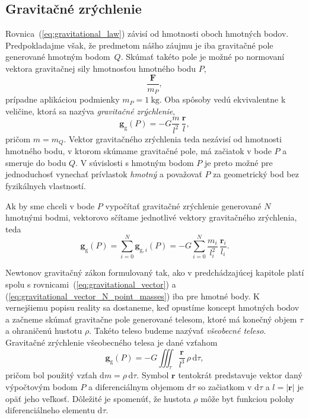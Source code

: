 \documentclass[a4paper, 12pt]{book}
\newcommand{\diff}{\mathrm d}
\newcommand{\gidx}{\mathrm g}
\let\vec\mathbf
\begin{document}
\subsection{Gravitačné zrýchlenie}

Rovnica~(\ref{eq:gravitational_law}) závisí od hmotnosti oboch hmotných bodov.  
Predpokladajme však, že predmetom nášho záujmu je iba gravitačné pole 
generované hmotným bodom~$Q$.  Skúmať takéto pole je možné po normovaní vektora 
gravitačnej sily hmotnosťou hmotného bodu $P$,
%
\begin{equation}
\frac{\vec F}{m_P}{,}
\end{equation}
%
prípadne aplikáciou podmienky $m_P = 1\ \mathrm{kg}$.  Oba spôsoby vedú 
ekvivalentne k veličine, ktorá sa nazýva \emph{gravitačné zrýchlenie},
%
\begin{equation}
\label{eq:gravitational_vector}
\vec g_\gidx(P) = -G \frac{m}{l^2} \, \frac{\vec r}{l}{,}
\end{equation}
%
pričom $m = m_Q$.  Vektor gravitačného zrýchlenia teda nezávisí od hmotnosti 
hmotného bodu, v ktorom skúmame gravitačné pole, má začiatok v bode $P$ 
a smeruje do bodu $Q$.  V súvislosti s hmotným bodom $P$ je preto možné pre 
jednoduchosť vynechať prívlastok \emph{hmotný} a považovať $P$ za geometrický 
bod bez fyzikálnych vlastností.

Ak by sme chceli v bode $P$ vypočítať gravitačné zrýchlenie generované $N$ 
hmotnými bodmi, vektorovo sčítame jednotlivé vektory gravitačného zrýchlenia, 
teda
%
\begin{equation}
\label{eq:gravitational_vector_N_point_masses}
\vec g_\gidx(P) = \sum_{i = 0}^{N}\vec g_{\gidx,i}(P) = -G \sum_{i = 0}^{N} 
\frac{m_i}{l_i^2} \, \frac{\vec r_i}{l_i}{.}
\end{equation}

Newtonov gravitačný zákon formulovaný tak, ako v predchádzajúcej kapitole platí 
spolu s rovnicami~(\ref{eq:gravitational_vector}) 
a (\ref{eq:gravitational_vector_N_point_masses}) iba pre hmotné body.  
K vernejšiemu popisu reality sa dostaneme, keď opustíme koncept hmotných bodov 
a začneme skúmať gravitačne pole generované telesom, ktoré má konečný objem 
$\tau$ a ohraničenú hustotu $\rho$.  Takéto teleso budeme nazývať 
\emph{všeobecné teleso}.  Gravitačné zrýchlenie všeobecného telesa je dané 
vzťahom
%
\begin{equation}
\label{eq:gravitational_vector_integral}
\vec g_\gidx(P) = -G \iiint_{\tau} \frac{\vec r}{l^3} \, \rho \, \diff\tau{,}
\end{equation}
%
pričom bol použitý vzťah $\diff m = \rho \, \diff \tau$.  Symbol $\vec r$ 
tentokrát predstavuje vektor daný výpočtovým bodom $P$ a diferenciálnym objemom 
$\diff\tau$ so začiatkom v $\diff\tau$ a $l = | \vec r |$ je opäť jeho veľkosť.  
Dôležité je spomenúť, že hustota $\rho$ môže byt funkciou polohy 
diferenciálneho elementu $\diff\tau$.
\end{document}

